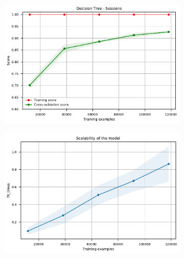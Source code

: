 \documentclass{l4proj}
\begin{document}
\begin{figure}[htbp]
    \centering
    \begin{subfigure}[b]{0.70\textwidth}
        \includegraphics[width=\textwidth]{images/sessions/learning_curve_1_DecisionTreeSessions.pdf}
        \caption{}
        \label{fig:learning_curve_1_DecisionTreeSessions}
    \end{subfigure}
    \begin{subfigure}[b]{0.70\textwidth}
        \includegraphics[width=\textwidth]{images/sessions/learning_curve_2_DecisionTreeSessions.pdf}
        \caption{}
        \label{fig:learning_curve_2_DecisionTreeSessions}
    \end{subfigure}
    \begin{subfigure}[b]{0.70\textwidth}

\end{subfigure}
\end{figure}
\end{document}
